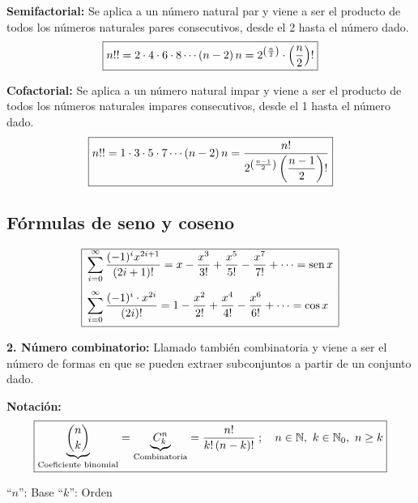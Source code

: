 \documentclass[11pt,a4paper]{article}
\begin{document}
\bigskip
\textbf{Semifactorial:} Se aplica a un número natural par y viene a ser el producto de
todos los números naturales pares consecutivos, desde el 2 hasta el número dado.
\[\fbox{$n!! = 2\cdot4\cdot6\cdot8\cdots(n-2)\,n = 2^{\left(\frac{n}{2}\right)}\cdot\left(\dfrac{n}{2}\right)!$}\]

\textbf{Cofactorial:} Se aplica a un número natural impar y viene a ser el producto de
todos los números naturales impares consecutivos, desde el 1 hasta el número dado.
\[\fbox{$n!! = 1\cdot3\cdot5\cdot7\cdots(n-2)\,n = \dfrac{n!}{2^{\left(\frac{n-1}{2}\right)}\left(\dfrac{n-1}{2}\right)!}$}\]


\subsection*{Fórmulas de seno y coseno}
\[
\begin{array}{|l|}
\hline
\displaystyle\sum_{i=0}^{\infty}\frac{(-1)^i x^{2i+1}}{(2i+1)!} = x - \frac{x^3}{3!} + \frac{x^5}{5!} - \frac{x^7}{7!} + \cdots = \operatorname{sen} x\\[16pt]
\displaystyle\sum_{i=0}^{\infty}\frac{(-1)^i\cdot x^{2i}}{(2i)!} = 1 - \frac{x^2}{2!} + \frac{x^4}{4!} - \frac{x^6}{6!} + \cdots = \cos x\\[12pt] \hline
\end{array}
\]

\textbf{2. Número combinatorio:} Llamado también combinatoria y viene a ser el número de
formas en que se pueden extraer subconjuntos a partir de un conjunto dado.

\textbf{Notación:}
\[
\fbox{$\underbrace{\dbinom{n}{k}}_{\text{Coeficiente binomial}} = \underbrace{C^{n}_{k}}_{\text{Combinatoria}} = \dfrac{n!}{k!\,(n-k)!}\;; \quad n \in \mathbb{N},\ k \in \mathbb{N}_0,\ n \geq k$}
\]
\begin{center}
``$n$'': Base \qquad ``$k$'': Orden
\end{center}
\end{document}
